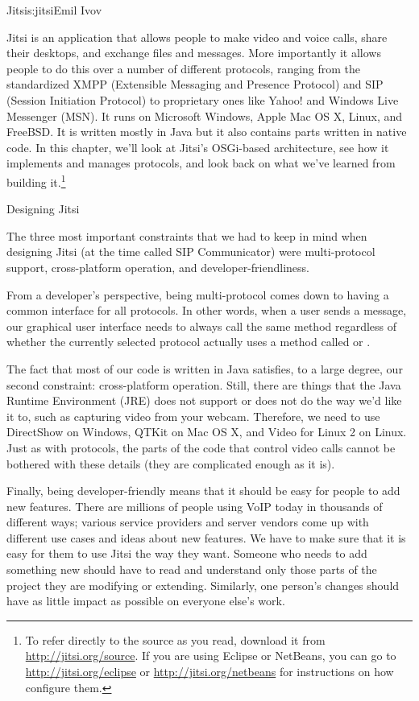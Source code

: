 \begin{aosachapter}{Jitsi}{s:jitsi}{Emil Ivov}

Jitsi is an application that allows people to make video and voice
calls, share their desktops, and exchange files and messages. More
importantly it allows people to do this over a number of different
protocols, ranging from the standardized XMPP (Extensible Messaging
and Presence Protocol) and SIP (Session Initiation Protocol) to
proprietary ones like Yahoo! and Windows Live Messenger (MSN).  It
runs on Microsoft Windows, Apple Mac OS X, Linux, and FreeBSD\@. It is
written mostly in Java but it also contains parts written in native
code.  In this chapter, we'll look at Jitsi's OSGi-based architecture,
see how it implements and manages protocols, and look back on what
we've learned from building it.\footnote{To refer directly to the
source as you read, download it from
\url{http://jitsi.org/source}.  If you are using Eclipse or NetBeans,
you can go to \url{http://jitsi.org/eclipse} or
\url{http://jitsi.org/netbeans} for instructions on how configure
them.}

\begin{aosasect1}{Designing Jitsi}

The three most important constraints that we had to keep in mind when
designing Jitsi (at the time called SIP Communicator) were
multi-protocol support, cross-platform operation, and
developer-friendliness.

From a developer's perspective, being multi-protocol comes down to
having a common interface for all protocols. In other words, when a
user sends a message, our graphical user interface needs to always
call the same  method regardless of whether the
currently selected protocol actually uses a method called
 or .

The fact that most of our code is written in Java satisfies, to a
large degree, our second constraint: cross-platform operation. Still,
there are things that the Java Runtime Environment (JRE) does not
support or does not do the way we'd like it to, such as capturing
video from your webcam. Therefore, we need to use DirectShow on
Windows, QTKit on Mac OS X, and Video for Linux 2 on Linux. Just as
with protocols, the parts of the code that control video calls cannot
be bothered with these details (they are complicated enough as it is).

Finally, being developer-friendly means that it should be easy for
people to add new features. There are millions of people using VoIP
today in thousands of different ways; various service providers and
server vendors come up with different use cases and ideas about new
features. We have to make sure that it is easy for them to use Jitsi
the way they want.  Someone who needs to add something new should have
to read and understand only those parts of the project they are
modifying or extending.  Similarly, one person's changes should have
as little impact as possible on everyone else's work.


\end{aosasect1}
\end{aosachapter}

